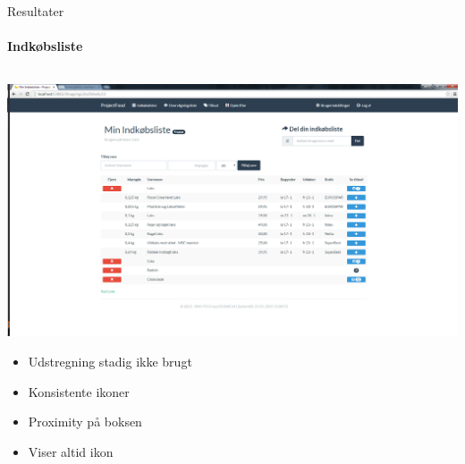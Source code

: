 \begin{frame}{Resultater}
\framesubtitle{Indkøbsliste}


	
	\begin{minipage}[0.3\textheight]{\textwidth}
	\begin{columns}[T]
	\begin{column}{1\textwidth}
	
	 \includegraphics[width=1\textwidth,height=1\textheight,keepaspectratio, trim={1cm 0 0 16mm}, clip]{images/Screenshots/ShoppingList.png}
	 
	 \begin{itemize}
	 	\item Udstregning stadig ikke brugt
	 	\item Konsistente ikoner
	 	\item Proximity på boksen
	 	\item Viser altid ikon 
	 \end{itemize}
	
	\end{column}

	\end{columns}

  \end{minipage}
	
\end{frame}


